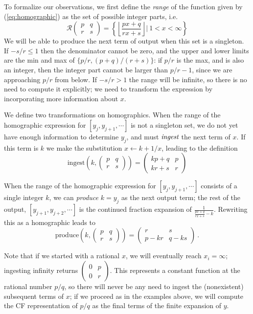 \documentclass[11pt, oneside]{amsart}   	%
\newcommand{\pqrs}{\left(
\begin{smallmatrix} 
p & q\\ 
r & s 
\end{smallmatrix}
\right)}
\newcommand{\homographic}[4]{\begin{pmatrix} #1 & #2\\ #3 & #4 \end{pmatrix}}
\begin{document}
To formalize our observations, we first define the \emph{range} of the function given by (\ref{eq:homographic}) as the set of possible integer parts, i.e.
\begin{equation}
\mathcal{R}\pqrs = \left\{ \left\lfloor \frac{px+q}{rx+s} \right\rfloor | \  1 < x < \infty \right\}
\end{equation}
We will be able to produce the next term of output when this set is a singleton. If $-s/r \leq 1$ then the denominator cannot be zero, and the upper and lower limits are the min and max of $\{p/r, (p+q)/(r+s)\}$: if $p/r$ is the max, and is also an integer, then the integer part cannot be larger than $p/r-1$, since we are approaching $p/r$ from below. If  $-s/r > 1$ the range will be infinite, so there is no need to compute it explicitly; we need to transform the expression by incorporating more information about $x$.

We define two transformations on homographics. When the range of the homographic expression for $[y_j,y_{j+1},\cdots]$ is not a singleton set, we do not yet have enough information to determine $y_j$, and must $\emph{ingest}$ the next term of $x$. If this term is $k$ we make the substitution $x \leftarrow k + 1/x$, leading to the definition
\begin{equation}
\mbox{ingest}(k,\pqrs) = \homographic{kp+q}{p}{kr+s}{r}%
\end{equation}


When the range of the homographic expression for $[y_j,y_{j+1},\cdots]$ consists of a single integer $k$, we can \emph{produce} $k=y_j$ as the next output term; the rest of the output, $[y_{j+1},y_{j+2},\cdots]$ is the continued fraction expansion of $\frac{1}{\frac{px+q}{rx+s}-k}$. Rewriting this as a homographic leads to 
\begin{equation}
\mbox{produce}(k,\pqrs) = \homographic{r}{s}{p-kr}{q-ks}\ .%
\end{equation}

Note that if we started with a rational $x$, we will eventually reach $x_i = \infty$; ingesting infinity returns ${\left(
\begin{smallmatrix} 
0 & p\\ 
0 & r
\end{smallmatrix}
\right)}$. This represents a constant function at the rational number $p/q$, so there will never be any need to ingest the (nonexistent) subsequent 
terms of $x$; if we proceed as in the examples above, we will compute the CF representation of $p/q$ as the final terms of the finite expansion of $y$.
\end{document}
